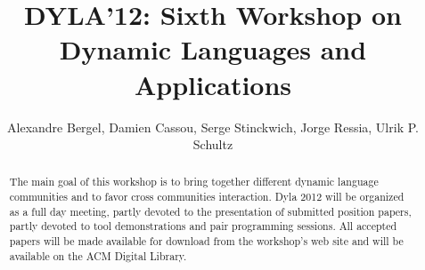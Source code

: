 \documentclass[runningheads]{llncs}
\begin{document}
\mainmatter

\title{DYLA'12: Sixth Workshop on Dynamic Languages and Applications}

\author{Alexandre Bergel, Damien Cassou, Serge Stinckwich, Jorge Ressia, Ulrik P. Schultz}






\maketitle

\begin{abstract}

The main goal of this workshop is to bring together different dynamic language communities and to favor cross communities interaction. Dyla 2012 will be organized as a full day meeting, partly devoted to the presentation of submitted position papers, partly devoted to tool demonstrations and pair programming sessions.  All accepted papers will be made available for download from the workshop's web site and will be available on the ACM Digital Library.

\end{abstract}
\end{document}
